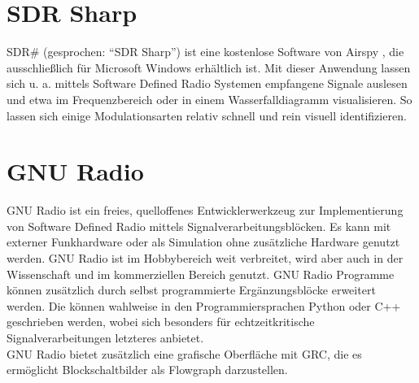 \section{SDR Sharp}
SDR\# (gesprochen: \enquote{SDR Sharp}) ist eine kostenlose Software von Airspy \cite{airspy:2018}, die ausschließlich für Microsoft Windows erhältlich ist. Mit dieser Anwendung lassen sich u. a. mittels Software Defined Radio Systemen empfangene Signale auslesen und etwa im Frequenzbereich oder in einem Wasserfalldiagramm visualisieren.
So lassen sich einige Modulationsarten relativ schnell und rein visuell identifizieren.


\section{GNU Radio}
GNU Radio \cite{gnuradio} ist ein freies, quelloffenes Entwicklerwerkzeug zur Implementierung von Software Defined Radio mittels Signalverarbeitungsblöcken. Es kann mit externer Funkhardware oder als Simulation ohne zusätzliche Hardware genutzt werden. GNU Radio ist im Hobbybereich weit verbreitet, wird aber auch in der Wissenschaft und im kommerziellen Bereich genutzt. GNU Radio Programme können zusätzlich durch selbst programmierte Ergänzungsblöcke erweitert werden. Die können wahlweise in den Programmiersprachen Python oder C++ geschrieben werden, wobei sich besonders für echtzeitkritische Signalverarbeitungen letzteres anbietet.\\
GNU Radio bietet zusätzlich eine grafische Oberfläche mit \ac{GRC}, die es ermöglicht Blockschaltbilder als Flowgraph darzustellen.

